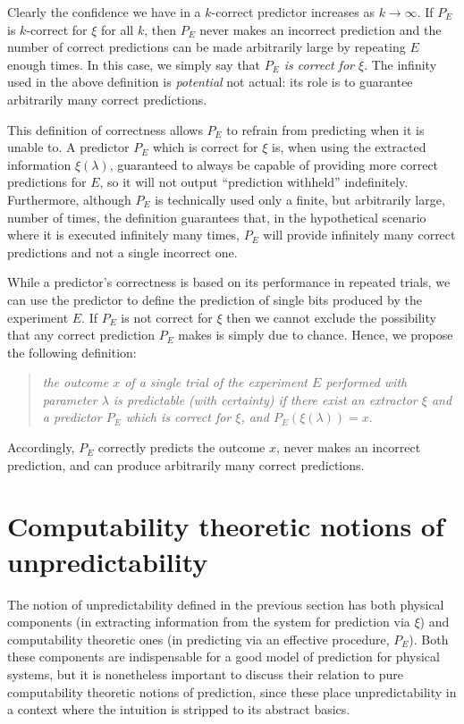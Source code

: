 \documentclass[%
 superscriptaddress,
 preprint,
 showpacs,
 showkeys,
 preprintnumbers,
 nofootinbib,
  amsmath,amssymb,
  aps,
 pra,
  longbibliography,
  floatfix,
 ]{revtex4-1}
\theoremstyle{definition}
\begin{document}
Clearly the confidence we have in a $k$-correct predictor increases as $k\to\infty$.
If $P_E$ is $k$-correct for $\xi$ for all $k$, then $P_E$ never makes an incorrect prediction and the number of correct predictions can be made arbitrarily large by repeating $E$ enough times.
In this case, we simply say that \emph{$P_E$ is correct for $\xi$}.
The infinity used in the above definition is \emph{potential} not
actual: its role is to guarantee arbitrarily many correct predictions.

This definition of correctness allows $P_E$ to refrain from predicting when it is unable to.
A predictor $P_E$ which is correct for $\xi$ is, when using the extracted information $\xi(\lambda)$, guaranteed to always be capable of providing more correct predictions for $E$, so it will not output ``prediction withheld'' indefinitely.
Furthermore, although $P_E$ is technically used only a finite, but arbitrarily large, number of times, the definition guarantees that, in the hypothetical scenario where it is executed infinitely many times, $P_E$ will provide  infinitely many correct predictions and not a single incorrect one.

While a predictor's correctness is based on its performance in repeated trials,  we can use the predictor to define the prediction of single bits produced by the experiment $E$.
If $P_E$ is not correct for $\xi$ then we cannot exclude the possibility that any correct prediction $P_E$ makes is simply due to chance.
Hence, we propose the following definition: \\[-4.8ex]
\begin{quote}
\emph{the outcome $x$ of a single trial of the experiment $E$ performed with parameter $\lambda$ is {\rm predictable} (with certainty) if there exist an extractor $\xi$ and a predictor $P_E$ which is correct for $\xi$, and $P_E(\xi(\lambda))=x$}.\\[-4.8ex]
\end{quote}
Accordingly, $P_{E}$ correctly predicts the outcome $x$, never makes an incorrect  prediction, and can produce arbitrarily many correct predictions.


\section{Computability theoretic notions of unpredictability}
\label{sec:alg}

The notion of unpredictability defined in the previous section has both physical components (in extracting information from the system for prediction via $\xi$) and computability theoretic ones (in predicting via an effective procedure, $P_E$).
Both these components are indispensable for a good model of prediction for physical systems, but it is nonetheless important to discuss their relation to pure computability theoretic notions of prediction, since these place unpredictability in a context where the intuition is stripped to its abstract basics.
\end{document}
